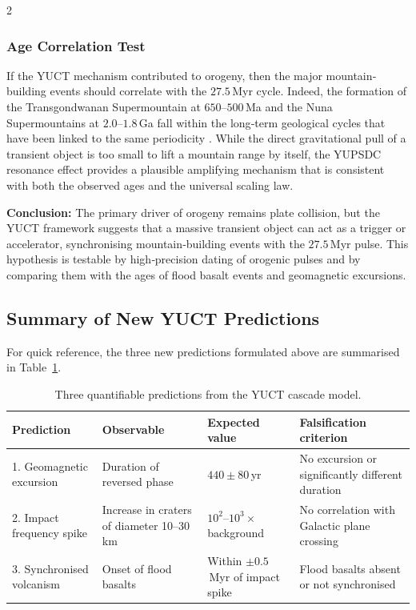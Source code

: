 \documentclass[11pt,a4paper]{article}
\begin{document}
\begin{multicols}{2}
		\subsubsection{Age Correlation Test}
		
		If the YUCT mechanism contributed to orogeny, then the major mountain‑
		building events should correlate with the \(27.5\) Myr cycle. Indeed,
		the formation of the Transgondwanan Supermountain at \(650\)–\(500\) Ma
		and the Nuna Supermountains at \(2.0\)–\(1.8\) Ga \cite{CampbellAllen2008}
		fall within the long‑term geological cycles that have been linked to
		the same periodicity \cite{Rampino2021}. While the direct gravitational
		pull of a transient object is too small to lift a mountain range by
		itself, the YUPSDC resonance effect provides a plausible amplifying
		mechanism that is consistent with both the observed ages and the
		universal scaling law.
		
		\vspace{0.3cm}
		\noindent
		\textbf{Conclusion:} The primary driver of orogeny remains plate collision,
		but the YUCT framework suggests that a massive transient object can
		act as a trigger or accelerator, synchronising mountain‑building events
		with the \(27.5\) Myr pulse. This hypothesis is testable by high‑precision
		dating of orogenic pulses and by comparing them with the ages of
		flood basalt events and geomagnetic excursions.
		
	\end{multicols}
	
	\subsection{Summary of New YUCT Predictions}
	
	For quick reference, the three new predictions formulated above are
	summarised in Table~\ref{tab:new_predictions}.
	
	\begin{table}[H]
		\centering
		\small
		\caption{Three quantifiable predictions from the YUCT cascade model.}
		\label{tab:new_predictions}
		\begin{tabular}{p{3.9cm} p{4.4cm} p{4.7cm} p{4.0cm}}
			\toprule
			\textbf{Prediction} & \textbf{Observable} & \textbf{Expected value} & \textbf{Falsification criterion} \\
			\midrule
			1. Geomagnetic excursion & Duration of reversed phase & \(440 \pm 80\) yr & No excursion or significantly different duration \\
			2. Impact frequency spike & Increase in craters of diameter 10–30 km & \(10^{2}\)–\(10^{3}\times\) background & No correlation with Galactic plane crossing \\
			3. Synchronised volcanism & Onset of flood basalts & Within \(\pm 0.5\) Myr of impact spike & Flood basalts absent or not synchronised \\
			\bottomrule
		\end{tabular}
	\end{table}
	
\end{document}
